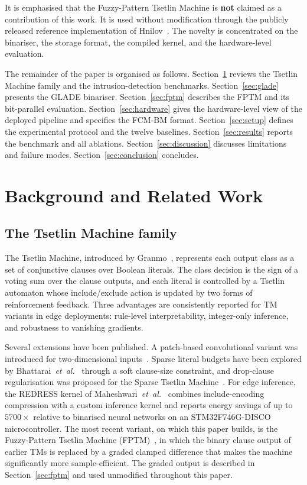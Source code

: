 \documentclass[journal,10pt]{IEEEtran}
\begin{document}
It is emphasised that the Fuzzy-Pattern Tsetlin Machine is \textbf{not}
claimed as a contribution of this work. It is used without modification
through the publicly released reference implementation of
Hnilov~\cite{hnilov2025fuzzy}. The novelty is concentrated on the
binariser, the storage format, the compiled kernel, and the
hardware-level evaluation.

The remainder of the paper is organised as follows.
Section~\ref{sec:related} reviews the Tsetlin Machine family and the
intrusion-detection benchmarks.
Section~\ref{sec:glade} presents the GLADE binariser.
Section~\ref{sec:fptm} describes the FPTM and its bit-parallel
evaluation. Section~\ref{sec:hardware} gives the hardware-level view
of the deployed pipeline and specifies the FCM-BM format.
Section~\ref{sec:setup} defines the experimental protocol and the
twelve baselines. Section~\ref{sec:results} reports the benchmark
and all ablations. Section~\ref{sec:discussion} discusses limitations
and failure modes. Section~\ref{sec:conclusion} concludes.

\section{Background and Related Work}
\label{sec:related}

\subsection{The Tsetlin Machine family}
\label{sec:related-tm}
The Tsetlin Machine, introduced by Granmo~\cite{granmo2018tsetlin},
represents each output class as a set of conjunctive clauses over
Boolean literals. The class decision is the sign of a voting sum over
the clause outputs, and each literal is controlled by a Tsetlin
automaton whose include/exclude action is updated by two forms of
reinforcement feedback. Three advantages are consistently reported
for TM variants in edge deployments: rule-level interpretability,
integer-only inference, and robustness to vanishing gradients.

Several extensions have been published. A patch-based convolutional
variant was introduced for two-dimensional
inputs~\cite{granmo2019convolutional}. Sparse literal budgets have
been explored by Bhattarai~\emph{et~al.}~\cite{bhattarai2023concise}
through a soft clause-size constraint, and drop-clause regularisation
was proposed for the Sparse Tsetlin
Machine~\cite{sharma2023drop}. For edge inference, the REDRESS
kernel of Maheshwari~\emph{et~al.}~\cite{maheshwari2023redress}
combines include-encoding compression with a custom inference kernel
and reports energy savings of up to $5700\times$ relative to
binarised neural networks on an STM32F746G-DISCO microcontroller.
The most recent variant, on which this paper builds, is the
Fuzzy-Pattern Tsetlin Machine (FPTM)~\cite{hnilov2025fuzzy}, in
which the binary clause output of earlier TMs is replaced by a
graded clamped difference that makes the machine significantly more
sample-efficient. The graded output is described in
Section~\ref{sec:fptm} and used unmodified throughout this paper.
\end{document}
